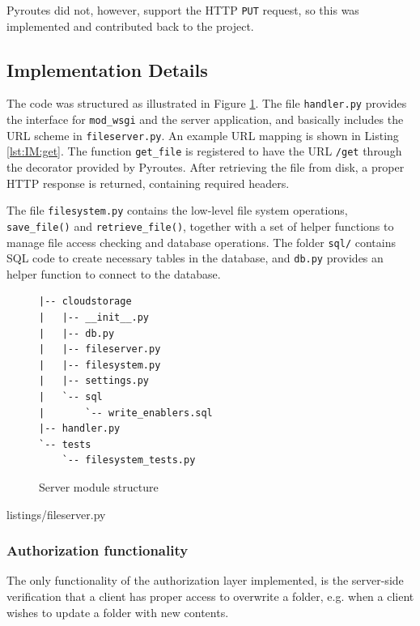 \documentclass[pdftex,english,10pt,b5paper,twoside]{book}
\begin{document}
Pyroutes did not, however, support the HTTP \texttt{PUT} request, so this was
implemented and contributed back to the project.


\subsection{Implementation Details}

The code was structured as illustrated in Figure \ref{fig:IM:layout}. The file
\texttt{handler.py} provides the interface for \texttt{mod\_wsgi} and the server
application, and basically includes the \ac{URL} scheme in
\texttt{fileserver.py}. An example \ac{URL} mapping is shown in Listing
\ref{lst:IM:get}. The function \texttt{get\_file} is registered to have the
\ac{URL} \texttt{/get} through the decorator provided by Pyroutes. After
retrieving the file from disk, a proper \ac{HTTP} response is returned,
containing required headers.

The file \texttt{filesystem.py} contains the low-level file system operations,
\texttt{save\_file()} and \texttt{retrieve\_file()}, together with a set of
helper functions to manage file access checking and database operations.  The
folder \texttt{sql/} contains \ac{SQL} code to create necessary tables in the
database, and \texttt{db.py} provides an helper function to connect to the
database.

\begin{figure}[h!]
\begin{verbatim}
|-- cloudstorage
|   |-- __init__.py
|   |-- db.py
|   |-- fileserver.py
|   |-- filesystem.py
|   |-- settings.py
|   `-- sql
|       `-- write_enablers.sql
|-- handler.py
`-- tests
    `-- filesystem_tests.py
\end{verbatim}
    \caption{Server module structure}
    \label{fig:IM:layout}
\end{figure}


{listings/fileserver.py}

\subsubsection{Authorization functionality}

The only functionality of the authorization layer implemented, is the
server-side verification that a client has proper access to overwrite a folder,
e.g. when a client wishes to update a folder with new contents.
\end{document}
